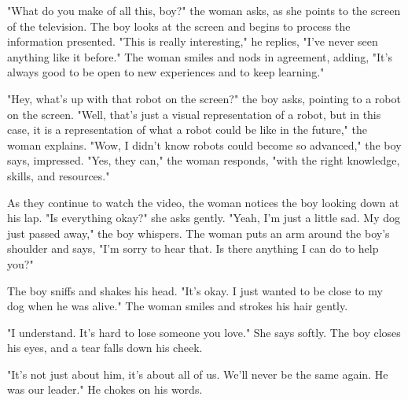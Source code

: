 \documentclass[smalldemyvopaper,11pt,twoside,onecolumn,openright,extrafontsizes]{memoir}
\begin{document}
"What do you make of all this, boy?" the woman asks, as she points to the screen of the television. The boy looks at the screen and begins to process the information presented. "This is really interesting," he replies, "I've never seen anything like it before." The woman smiles and nods in agreement, adding, "It's always good to be open to new experiences and to keep learning."\par
"Hey, what's up with that robot on the screen?" the boy asks, pointing to a robot on the screen. "Well, that's just a visual representation of a robot, but in this case, it is a representation of what a robot could be like in the future," the woman explains. "Wow, I didn't know robots could become so advanced," the boy says, impressed. "Yes, they can," the woman responds, "with the right knowledge, skills, and resources."\par
As they continue to watch the video, the woman notices the boy looking down at his lap. "Is everything okay?" she asks gently. "Yeah, I'm just a little sad. My dog just passed away," the boy whispers. The woman puts an arm around the boy's shoulder and says, "I'm sorry to hear that. Is there anything I can do to help you?"\par
The boy sniffs and shakes his head. "It's okay. I just wanted to be close to my dog when he was alive." The woman smiles and strokes his hair gently.\par
"I understand. It's hard to lose someone you love." She says softly. The boy closes his eyes, and a tear falls down his cheek.\par
"It's not just about him, it's about all of us. We'll never be the same again. He was our leader." He chokes on his words.\par
\end{document}
